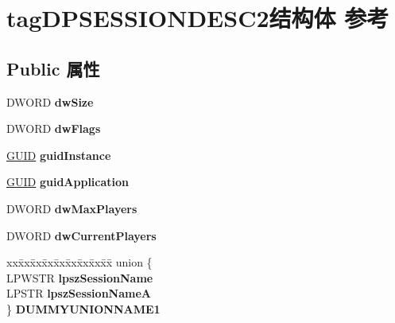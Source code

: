 \hypertarget{structtag_d_p_s_e_s_s_i_o_n_d_e_s_c2}{}\section{tag\+D\+P\+S\+E\+S\+S\+I\+O\+N\+D\+E\+S\+C2结构体 参考}
\label{structtag_d_p_s_e_s_s_i_o_n_d_e_s_c2}
\subsection*{Public 属性}
\begin{DoxyCompactItemize}
\item 
\mbox{\label{structtag_d_p_s_e_s_s_i_o_n_d_e_s_c2_ae55b6fff1359c6e4f4b2e12ef3439dcf}} 
D\+W\+O\+RD {\bfseries dw\+Size}
\item 
\mbox{\label{structtag_d_p_s_e_s_s_i_o_n_d_e_s_c2_a4925e9c22d7d4ac656500153684ce760}} 
D\+W\+O\+RD {\bfseries dw\+Flags}
\item 
\mbox{\label{structtag_d_p_s_e_s_s_i_o_n_d_e_s_c2_ae4449ddf495f99fda94198a1983d26af}} 
\hyperlink{interface_g_u_i_d}{G\+U\+ID} {\bfseries guid\+Instance}
\item 
\mbox{\label{structtag_d_p_s_e_s_s_i_o_n_d_e_s_c2_a55d273a9c4ff029216eaf3e2237963e8}} 
\hyperlink{interface_g_u_i_d}{G\+U\+ID} {\bfseries guid\+Application}
\item 
\mbox{\label{structtag_d_p_s_e_s_s_i_o_n_d_e_s_c2_a280bf92619a8a8dc64e598feeaaf729f}} 
D\+W\+O\+RD {\bfseries dw\+Max\+Players}
\item 
\mbox{\label{structtag_d_p_s_e_s_s_i_o_n_d_e_s_c2_a05918f2f15f28173a5f3c4474b42e31a}} 
D\+W\+O\+RD {\bfseries dw\+Current\+Players}
\item 
\mbox{\label{structtag_d_p_s_e_s_s_i_o_n_d_e_s_c2_aae6e1880d47de41fa9831479194a7b8c}} 
\begin{tabbing}
xx\=xx\=xx\=xx\=xx\=xx\=xx\=xx\=xx\=\kill
union \{\\
\>LPWSTR {\bfseries lpszSessionName}\\
\>LPSTR {\bfseries lpszSessionNameA}\\
\} {\bfseries DUMMYUNIONNAME1}\\


\end{tabbing}
\end{DoxyCompactItemize}
